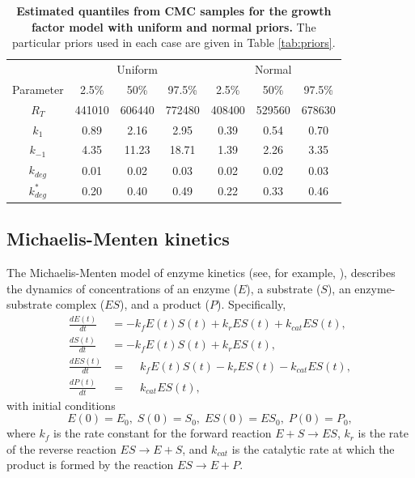 \documentclass[10pt,letterpaper]{article}
\begin{document}
\begin{table}
\begin{tabular}{c|ccc|ccc}
	& \multicolumn{3}{c}{Uniform} & \multicolumn{3}{c}{Normal}\\
	Parameter & 2.5\% & 50\% & 97.5\% & 2.5\% & 50\% & 97.5\%\\
	\toprule
	$R_T$ & 441010 & 606440 & 772480 & 408400 & 529560 & 678630 \\
	$k_1$ & 0.89 & 2.16 & 2.95 & 0.39 & 0.54 & 0.70 \\
	$k_{-1}$ & 4.35 & 11.23 & 18.71 & 1.39 & 2.26 & 3.35 \\
	$k_{deg}$ & 0.01 & 0.02 & 0.03 & 0.02 & 0.02 & 0.03 \\
	$k^*_{deg}$ & 0.20 & 0.40 & 0.49 & 0.22 & 0.33 & 0.46 \\
\end{tabular}
\caption{\textbf{Estimated quantiles from CMC samples for the growth factor model with uniform and normal priors.} The particular priors used in each case are given in Table \ref{tab:priors}.}
\label{tab:growth_factor_results}
\end{table}

\subsection{Michaelis-Menten kinetics}
The Michaelis-Menten model of enzyme kinetics (see, for example, \cite{murray2007mathematical}), describes the dynamics of concentrations of an enzyme ($E$), a substrate ($S$), an enzyme-substrate complex ($ES$), and a product ($P$). Specifically,
%
\begin{equation}\label{eq:michaelis_menten}
\begin{aligned}
\frac{dE(t)}{dt}  &= -k_f E(t)S(t) + k_r ES(t) + k_{cat} ES(t), \\
\frac{dS(t)}{dt}  &= -k_f E(t)S(t) + k_r ES(t), \\
\frac{dES(t)}{dt} &= \phantom{-}k_f E(t)S(t) - k_r ES(t) - k_{cat} ES(t), \\
\frac{dP(t)}{dt}  &= \phantom{-}k_{cat} ES(t),
\end{aligned}
\end{equation}
%
with initial conditions
\begin{equation}
E(0) = E_0, \; S(0)=S_0, \; ES(0)=ES_0, \; P(0)=P_0,
\end{equation}
%
where $k_f$ is the rate constant for the forward reaction $E+S\rightarrow ES$, $k_r$ is the rate of the reverse reaction $ES\rightarrow E+S$, and $k_{cat}$ is the catalytic rate at which the product is formed by the reaction $ES\rightarrow E + P$.
\end{document}

